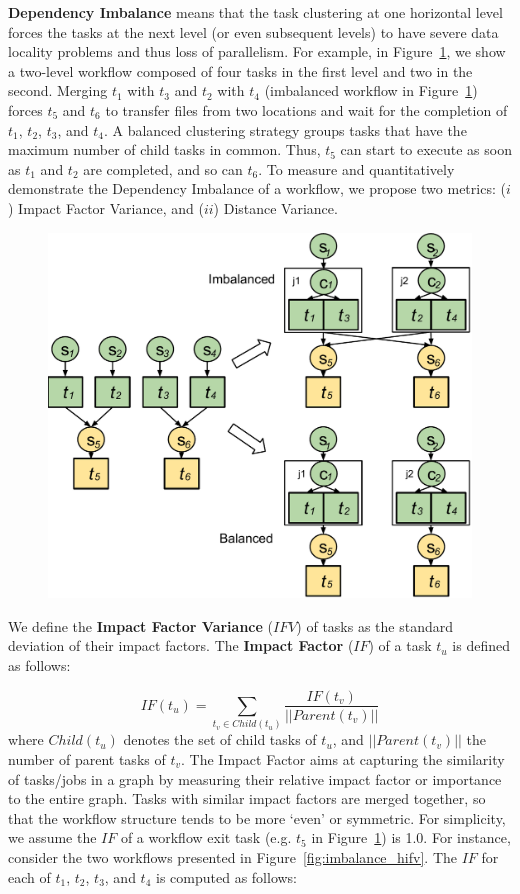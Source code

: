 \textbf{Dependency Imbalance} means that the task clustering at one horizontal level forces the tasks at the next level (or even subsequent levels) to have severe data locality problems and thus loss of parallelism. For example, in Figure~\ref{fig:imbalance_dv}, we show a two-level workflow composed of four tasks in the first level and two in the second. Merging $t_1$ with $t_3$ and $t_2$ with $t_4$ (imbalanced workflow in Figure~\ref{fig:imbalance_dv}) forces $t_5$ and $t_6$ to transfer files from two locations and wait for the completion of $t_1$, $t_2$, $t_3$, and $t_4$.  A balanced clustering strategy groups tasks that have the maximum number of child tasks in common. Thus, $t_5$ can start to execute as soon as $t_1$ and $t_2$ are completed, and so can $t_6$. To measure and quantitatively demonstrate the Dependency Imbalance of a workflow, we propose two  metrics: ($i$) Impact Factor Variance, and ($ii$) Distance Variance. 

\begin{figure}[htb]
	\centering
	\includegraphics[width=0.8\linewidth]{figures/balance/figure6.pdf}
	\label{fig:imbalance_dv}
\end{figure}

We define the \textbf{Impact Factor Variance} ($IFV$) of tasks as the standard deviation of their impact factors. The \textbf{Impact Factor} ($IF$) of a task $t_u$ is defined as follows:

\begin{equation}
\label{eq:imbalance_impact_factor}
	IF(t_u)=\sum_{t_v\in Child(t_u)}^{}\frac{IF(t_v)}{||Parent(t_v)||}
\end{equation}
where $Child(t_u)$ denotes the set of child tasks of $t_u$, and $||Parent(t_v)||$ the number of parent tasks of $t_v$. The Impact Factor aims at capturing the similarity of tasks/jobs in a graph by measuring their relative impact factor or importance to the entire graph. Tasks with similar impact factors are merged together, so that the workflow structure tends to be more `even' or symmetric. For simplicity, we assume the $IF$ of a workflow exit task (e.g. $t_5$ in Figure~\ref{fig:imbalance_dv}) is 1.0. For instance, consider the two workflows presented in Figure~\ref{fig:imbalance_hifv}. The $IF$ for each of $t_1$, $t_2$, $t_3$, and $t_4$ is computed as follows:

